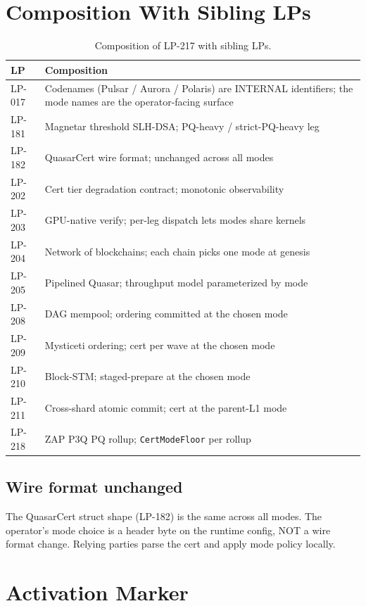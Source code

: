 \section{Composition With Sibling LPs}

\begin{table}[h]
\centering
\small
\begin{tabular}{@{}lp{9cm}@{}}
\toprule
\textbf{LP} & \textbf{Composition} \\
\midrule
LP-017 & Codenames (Pulsar / Aurora / Polaris) are INTERNAL identifiers; the mode names are the operator-facing surface \\
LP-181 & Magnetar threshold SLH-DSA; PQ-heavy / strict-PQ-heavy leg \\
LP-182 & QuasarCert wire format; unchanged across all modes \\
LP-202 & Cert tier degradation contract; monotonic observability \\
LP-203 & GPU-native verify; per-leg dispatch lets modes share kernels \\
LP-204 & Network of blockchains; each chain picks one mode at genesis \\
LP-205 & Pipelined Quasar; throughput model parameterized by mode \\
LP-208 & DAG mempool; ordering committed at the chosen mode \\
LP-209 & Mysticeti ordering; cert per wave at the chosen mode \\
LP-210 & Block-STM; staged-prepare at the chosen mode \\
LP-211 & Cross-shard atomic commit; cert at the parent-L1 mode \\
LP-218 & ZAP P3Q PQ rollup; \texttt{CertModeFloor} per rollup \\
\bottomrule
\end{tabular}
\caption{Composition of LP-217 with sibling LPs.}
\label{tab:composition}
\end{table}

\subsection{Wire format unchanged}

The QuasarCert struct shape (LP-182) is the same across all modes.
The operator's mode choice is a header byte on the runtime config,
NOT a wire format change. Relying parties parse the cert and apply
mode policy locally.

\section{Activation Marker}

